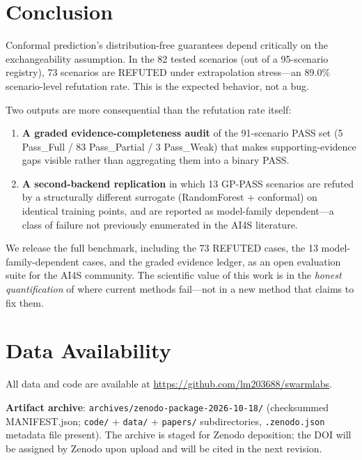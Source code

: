 \documentclass[journal]{IEEEtran}
\begin{document}
\section{Conclusion}
\label{sec:conclusion}

Conformal prediction's distribution-free guarantees depend critically on the
exchangeability assumption. In the 82 tested scenarios (out of a 95-scenario
registry), 73 scenarios are REFUTED under extrapolation stress---an 89.0\%
scenario-level refutation rate. This is the expected behavior, not a bug.

Two outputs are more consequential than the refutation rate itself:

\begin{enumerate}
    \item \textbf{A graded evidence-completeness audit} of the 91-scenario PASS
    set (5 Pass\_Full / 83 Pass\_Partial / 3 Pass\_Weak) that makes
    supporting-evidence gaps visible rather than aggregating them into a binary
    PASS.
    \item \textbf{A second-backend replication} in which 13 GP-PASS scenarios
    are refuted by a structurally different surrogate (RandomForest + conformal)
    on identical training points, and are reported as model-family dependent---a
    class of failure not previously enumerated in the AI4S literature.
\end{enumerate}

We release the full benchmark, including the 73 REFUTED cases, the 13
model-family-dependent cases, and the graded evidence ledger, as an open
evaluation suite for the AI4S community. The scientific value of this work is in
the \textit{honest quantification} of where current methods fail---not in a new
method that claims to fix them.


\section*{Data Availability}

All data and code are available at \url{https://github.com/lm203688/swarmlabs}.

\textbf{Artifact archive}: \texttt{archives/zenodo-package-2026-10-18/}
(checksummed MANIFEST.json; \texttt{code/} + \texttt{data/} + \texttt{papers/}
subdirectories, \texttt{.zenodo.json} metadata file present). The archive is
staged for Zenodo deposition; the DOI will be assigned by Zenodo upon upload
and will be cited in the next revision.
\end{document}
